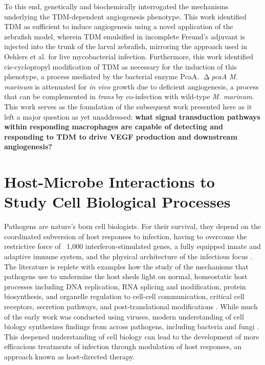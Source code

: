 To this end, \citeauthor{Walton2018} genetically and biochemically interrogated the mechanisms underlying the TDM\hyp{}dependent angiogenesis phenotype. This work identified TDM as sufficient to induce angiogenesis using a novel application of the zebrafish model, wherein TDM emulsified in incomplete Freund's adjuvant is injected into the trunk of the larval zebrafish, mirroring the approach used in Oehlers et al. for live mycobacterial infection. Furthermore, this work identified cis\hyp{}cyclopropyl modification of TDM as necessary for the induction of this phenotype, a process mediated by the bacterial enzyme PcaA. $\upDelta$\textit{pcaA} \textit{M. marinum} is attenuated for \textit{in vivo} growth due to deficient angiogenesis, a process that can be complemented in \textit{trans} by co\hyp{}infection with wild\hyp{}type \textit{M. marinum}. This work serves as the foundation of the subsequent work presented here as it left a major question as yet unaddressed: \textbf{what signal transduction pathways within responding macrophages are capable of detecting and responding to TDM to drive VEGF production and downstream angiogenesis?}

\section{Host\hyp{}Microbe Interactions to Study Cell Biological Processes}\label{hmi}

Pathogens are nature's born cell biologists. For their survival, they depend on the coordinated subversion of host responses to infection, having to overcome the restrictive force of ~1,000 interferon\hyp{}stimulated genes, a fully equipped innate and adaptive immune system, and the physical architecture of the infectious focus \citep{MacMicking2014, Byrne1986}. The literature is replete with examples how the study of the mechanisms that pathogens use to undermine the host sheds light on normal, homeostatic host processes including DNA replication, RNA splicing and modification, protein biosynthesis, and organelle regulation to cell\hyp{}cell communication, critical cell receptors, secretion pathways, and post\hyp{}translational modifications \citep{Compans1994}. While much of the early work was conducted using viruses, modern understanding of cell biology synthesizes findings from across pathogens, including bacteria and fungi \citep{Welch2015}. This deepened understanding of cell biology can lead to the development of more efficacious treatments of infection through modulation of host responses, an approach known as host\hyp{}directed therapy.

